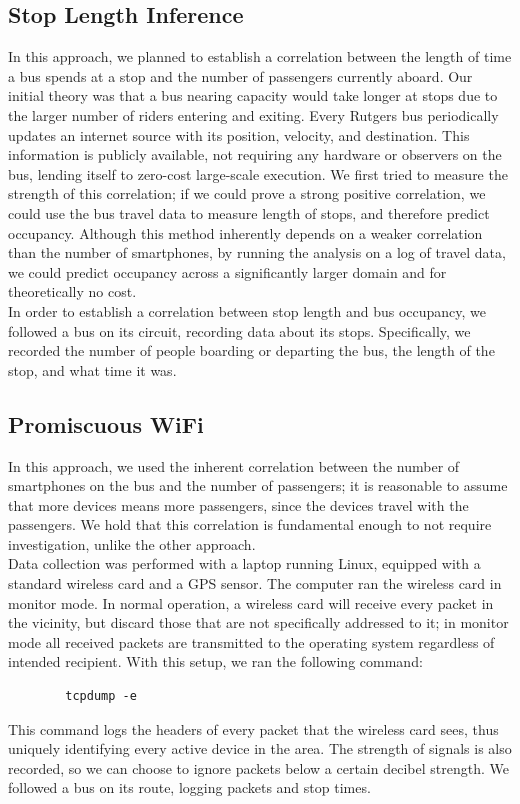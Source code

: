 \documentclass[letterpaper,abstract=on,titlepage=false]{scrreprt}
\begin{document}
	\subsection*{Stop Length Inference}

	In this approach, we planned to establish a correlation between the length of time a bus spends at a stop and the number of passengers currently aboard.
Our initial theory was that a bus nearing capacity would take longer at stops due to the larger number of riders entering and exiting.
	Every Rutgers bus periodically updates an internet source with its position, velocity, and destination.
	This information is publicly available, not requiring any hardware or observers on the bus, lending itself to zero-cost large-scale execution.
	We first tried to measure the strength of this correlation; if we could prove a strong positive correlation, we could use the bus travel data to measure length of stops, and therefore predict occupancy.
	Although this method inherently depends on a weaker correlation than the number of smartphones, by running the analysis on a log of travel data, we could predict occupancy across a significantly larger domain and for theoretically no cost.
	\\
	In order to establish a correlation between stop length and bus occupancy, we followed a bus on its circuit, recording data about its stops. Specifically, we recorded the number of people boarding or departing the bus, the length of the stop, and what time it was.

	\subsection*{Promiscuous WiFi}

	In this approach, we used the inherent correlation between the number of smartphones on the bus and the number of passengers; it is reasonable to assume that more devices means more passengers, since the devices travel with the passengers.
	We hold that this correlation is fundamental enough to not require investigation, unlike the other approach.\\
    Data collection was performed with a laptop running Linux, equipped with a standard wireless card and a GPS sensor.
	The computer ran the wireless card in monitor mode.
	In normal operation, a wireless card will receive every packet in the vicinity, but discard those that are not specifically addressed to it; in monitor mode all received packets are transmitted to the operating system regardless of intended recipient. With this setup, we ran the following command:
	\begin{verbatim}
		tcpdump -e
	\end{verbatim}
	This command logs the headers of every packet that the wireless card sees, thus uniquely identifying every active device in the area.
	The strength of signals is also recorded, so we can choose to ignore packets below a certain decibel strength.
	We followed a bus on its route, logging packets and stop times.
    
\end{document}
